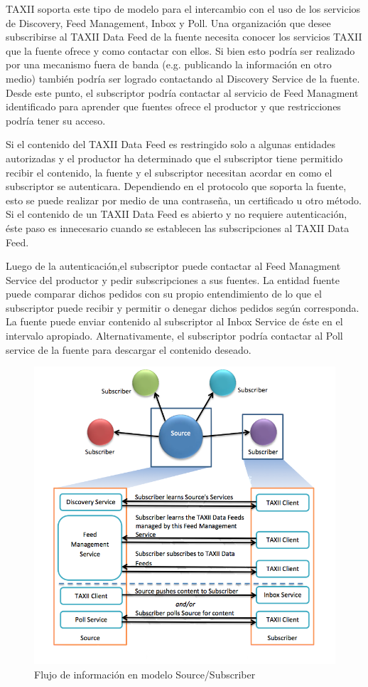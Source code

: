 TAXII soporta este tipo de modelo para el intercambio con el uso de los servicios de 
Discovery, Feed Management, Inbox y Poll. Una organización que desee 
subscribirse al TAXII Data Feed de la fuente necesita conocer los servicios 
TAXII que la fuente ofrece y como contactar con ellos. Si bien esto podría ser 
realizado por una mecanismo fuera de banda (e.g. publicando la información en otro medio)
también podría ser logrado contactando al Discovery Service de la fuente. Desde 
este punto, el subscriptor podría contactar al servicio de Feed Managment 
identificado para aprender que fuentes ofrece el productor y que restricciones 
podría tener su acceso.

Si el contenido del TAXII Data Feed es restringido solo a algunas entidades 
autorizadas y el productor ha determinado que el subscriptor tiene permitido 
recibir el contenido, la fuente y el subscriptor necesitan acordar en como el 
subscriptor se autenticara. Dependiendo en el protocolo que soporta la fuente, 
esto se puede realizar por medio de una contraseña, un certificado u otro método. 
Si el contenido de un TAXII Data Feed es abierto y no requiere 
autenticación, éste paso es innecesario cuando se establecen las subscripciones 
al TAXII Data Feed.

Luego de la autenticación,el subscriptor puede contactar al Feed Managment Service del 
productor y pedir subscripciones a sus fuentes. La entidad fuente puede 
comparar dichos pedidos con su propio entendimiento de lo que el subscriptor 
puede recibir y permitir o denegar dichos pedidos según corresponda. La fuente 
puede enviar contenido al subscriptor al Inbox Service de éste en el intervalo 
apropiado. Alternativamente, el subscriptor podría contactar al Poll service de 
la fuente para descargar el contenido deseado.

\begin{figure}[ht!]
  \centering
    \includegraphics[width=150mm]{./images/SourceSuscriberModel.png}
    \caption{Flujo de información en modelo Source/Subscriber \protect\cite{b1}}
\end{figure}

